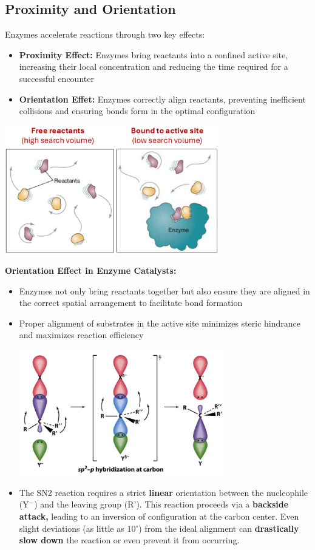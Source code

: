 \documentclass[10pt]{article}
\begin{document}
\subsection*{Proximity and Orientation}
Enzymes accelerate reactions through two key effects:
\begin{itemize}
    \item \textbf{Proximity Effect:} Enzymes bring reactants into a confined active site, increasing their local concentration and reducing the time required for a successful encounter
    \item \textbf{Orientation Effet:} Enzymes correctly align reactants, preventing inefficient collisions and ensuring bonds form in the optimal configuration
\end{itemize}
\begin{center}
    \includegraphics*[width=0.7\textwidth]{L2_10.png} 
\end{center}
\textbf{Orientation Effect in Enzyme Catalysts:}
\begin{itemize}
    \item Enzymes not only bring reactants together but also ensure they are aligned in the correct spatial arrangement to facilitate bond formation
    \item Proper alignment of substrates in the active site minimizes steric hindrance and maximizes reaction efficiency
    \begin{center}
        \includegraphics*[width=0.7\textwidth]{L2_11.png} 
    \end{center}
    \item The SN2 reaction requires a strict \textbf{linear} orientation between the nucleophile (Y$^-$) and the leaving group (R').  This reaction proceeds via a \textbf{backside attack,} leading to an inversion of configuration at the carbon center.  Even slight deviations (as little as 10$^\circ$) from the ideal alignment can \textbf{drastically slow down} the reaction or even prevent it from occurring.
\end{itemize}
\end{document}
